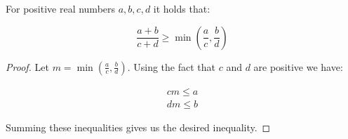 \begin{lemma}\label{lem:fraction}
For positive real numbers $a, b, c, d$ it holds that:

$$
\frac{a + b}{c + d} \geq \min\left(\frac{a}{c}, \frac{b}{d}\right)
$$
\end{lemma}
\begin{proof}
Let $m = \min \left(\frac{a}{c}, \frac{b}{d}\right)$. Using the fact that $c$
and $d$ are positive we have:

\begin{gather*}
c m \leq a \\
d m \leq b
\end{gather*}

Summing these inequalities gives us the desired inequality.
\end{proof}

\begin{thm}

\end{thm}
